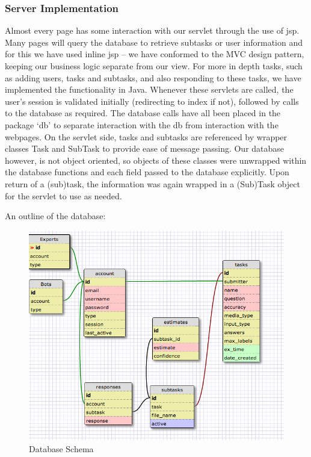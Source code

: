 \documentclass[11pt]{article}
\begin{document}
\subsubsection{Server Implementation}
Almost every page has some interaction with our servlet through the use of jsp.
Many pages will query the database to retrieve subtasks or user information and for
this we have used inline jsp -- we have conformed to the MVC design pattern, keeping
our business logic separate from our view. For more in depth tasks, such as
adding users, tasks and subtasks, and also responding
to these tasks, we have implemented the functionality in Java. Whenever these servlets
are called, the user's session is validated initially (redirecting to index if not),
followed by calls to the database as required. The database calls have all been placed
in the package `db' to separate interaction with the db from interaction with the webpages.
On the servlet side, tasks and subtasks are referenced by wrapper classes Task and SubTask
to provide ease of message passing. Our database however, is not object oriented, so
objects of these classes were unwrapped within the database functions and each field
passed to the database explicitly. Upon return of a (sub)task, the information was again
wrapped in a (Sub)Task object for the servlet to use as needed.

An outline of the database:

\begin{figure}[H]
\begin{center}
\includegraphics[width=\linewidth]{images/schema.png}
\caption{Database Schema}
\label{default}
\end{center}
\end{figure}
\end{document}
